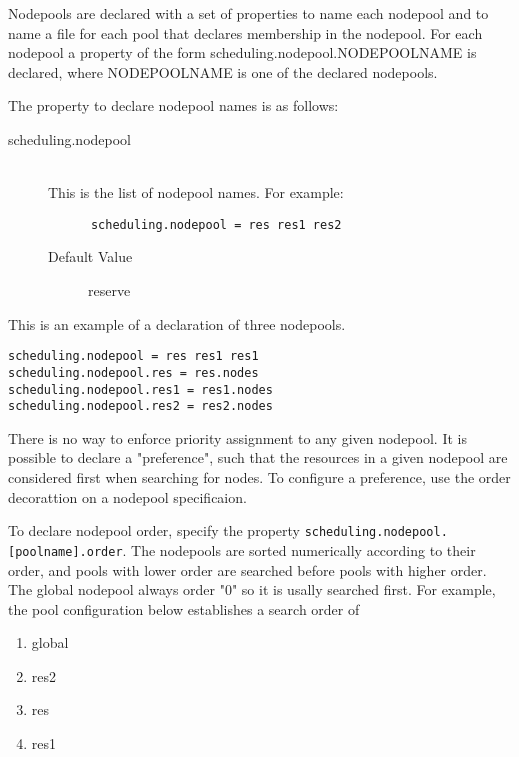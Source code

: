     Nodepools are declared with a set of properties to name each nodepool and to name a file for 
    each pool that declares membership in the nodepool. For each nodepool a property of the form 
    scheduling.nodepool.NODEPOOLNAME is declared, where NODEPOOLNAME is one of the 
    declared nodepools. 

    The property to declare nodepool names is as follows: 

    \begin{description}
      \item[scheduling.nodepool] \hfill \\
      This is the list of nodepool names. For example: 
\begin{verbatim}
      scheduling.nodepool = res res1 res2 
\end{verbatim}
      \begin{description}
        \item[Default Value] reserve 
      \end{description}
    \end{description}
        
    This is an example of a declaration of three nodepools. 

\begin{verbatim}
scheduling.nodepool = res res1 res1 
scheduling.nodepool.res = res.nodes 
scheduling.nodepool.res1 = res1.nodes 
scheduling.nodepool.res2 = res2.nodes 
\end{verbatim}
    
    There is no way to enforce priority assignment to any given nodepool. It is possible to declare a 
    "preference", such that the resources in a given nodepool are considered first when searching for 
    nodes. To configure a preference, use the order decorattion on a nodepool specificaion. 

    To declare nodepool order, specify the property {\tt scheduling.nodepool.[poolname].order}. The
    nodepools are sorted numerically according to their order, and pools with lower order are
    searched before pools with higher order. The global nodepool always order "0" so it is usally
    searched first. For example, the pool configuration below establishes a search order of

    \begin{enumerate}
      \item global 
      \item res2 
      \item res 
      \item res1 
    \end{enumerate}
    
